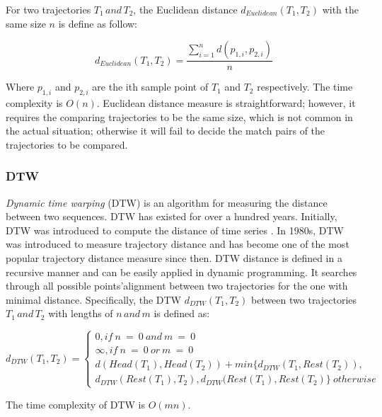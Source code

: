 \documentclass[a4paper, 12pt]{article}
\begin{document}
For two trajectories $T_{1}\,and\,T_{2}$, the Euclidean distance $d_{Euclidean}(T_{1}, T_{2})$ with the same size $n$ is define as follow:

\begin{equation} \label{eq1}
    d_{Euclidean}(T_{1}, T_{2}) = \frac{\sum_{i=1}^n d(p_{1,i}, p_{2,i})}{n}
\end{equation}

Where $p_{1,i}$ and $p_{2,i}$ are the ith sample point of $T_{1}$ and $T_{2}$ respectively. The time complexity is $O(n)$. Euclidean distance measure is straightforward; however, it requires the comparing trajectories to be the same size, which is not common in the actual situation; otherwise it will fail to decide the match pairs of the trajectories to be compared.

\subsubsection{DTW}
\textit{Dynamic time warping} (DTW) is an algorithm for measuring the distance between two sequences. DTW has existed for over a hundred years. Initially, DTW was introduced to compute the distance of time series \citep{myers1980performance}. In 1980s, DTW was introduced to measure trajectory distance \citep{kruskal1983overview} and has become one of the most popular trajectory distance measure since then. DTW distance is defined in a recursive manner and can be easily applied in dynamic programming. It searches through all possible points’alignment between two trajectories for the one with minimal distance. Specifically, the DTW $d_{DTW} (T_{1},T_{2})$ between two trajectories $T_{1}\,and\,T_{2}$ with lengths of $n\,and\,m$ is defined as:

\begin{equation} \label{eq2}
    d_{DTW} (T_{1},T_{2}) = \begin{cases}
                                0, if\:n\:=\:0\:and\:m\:=\:0 \\
                                \infty, if\:n\:=\:0\:or\:m\:=\:0 \\
                                d(Head(T_{1}), Head(T_{2})) + min\{d_{DTW}(T_{1}, Rest(T_{2})), \\ d_{DTW}(Rest(T_{1}), T_{2}), d_{DTW}(Rest(T_{1}), Rest(T_{2}) \} \: otherwise
                            \end{cases}
\end{equation}

The time complexity of DTW is $O(mn)$.
\end{document}
